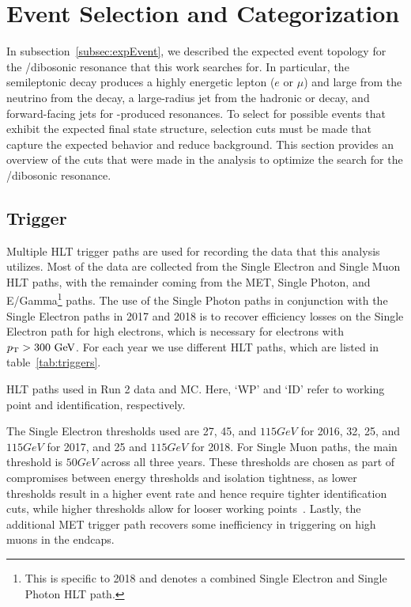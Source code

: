 
\section{Event Selection and Categorization}
\label{sec:events}

In subsection~\ref{subsec:expEvent}, we described the expected event topology for the \WV/\WH dibosonic resonance that this work searches for.
In particular, the semileptonic decay produces a highly energetic lepton ($e$ or $\mu$) and large \ptmiss from the neutrino from the \Wtolnu decay, a large-radius jet from the hadronic \Vtoqqbarpr or \Htobbbar decay, and forward-facing \VBF jets for \VBF-produced resonances.
To select for possible events that exhibit the expected final state structure, selection cuts must be made that capture the expected behavior and reduce background.
This section provides an overview of the cuts that were made in the analysis to optimize the search for the \WV/\WH dibosonic resonance.

\subsection{Trigger}

Multiple HLT trigger paths are used for recording the data that this analysis utilizes.
Most of the data are collected from the Single Electron and Single Muon HLT paths, with the remainder coming from the MET, Single Photon, and E/Gamma\footnote{This is specific to 2018 and denotes a combined Single Electron and Single Photon HLT path.} paths.
The use of the Single Photon paths in conjunction with the Single Electron paths in 2017 and 2018 is to recover efficiency losses on the Single Electron path for high \pt electrons, which is necessary for electrons with $\pt>300\unit{GeV}$.
For each year we use different HLT paths, which are listed in table~\ref{tab:triggers}.

\begin{table}[htbp]
  \centering
  
  \caption{
    HLT paths used in Run 2 data and MC.
    Here, `WP' and `ID' refer to working point and identification, respectively.
  }
  \label{tab:triggers}
\end{table}

The Single Electron \pt thresholds used are 27, 45, and $115\unit{GeV}$ for 2016, 32, 25, and $115\unit{GeV}$ for 2017, and 25 and $115\unit{GeV}$ for 2018.
For Single Muon paths, the main threshold is $50\unit{GeV}$ across all three years.
These thresholds are chosen as part of compromises between energy thresholds and isolation tightness, as lower \pt thresholds result in a higher event rate and hence require tighter identification cuts, while higher \pt thresholds allow for looser working points~\cite{MuonPOG}.
Lastly, the additional MET trigger path recovers some inefficiency in triggering on high \pt muons in the endcaps.

